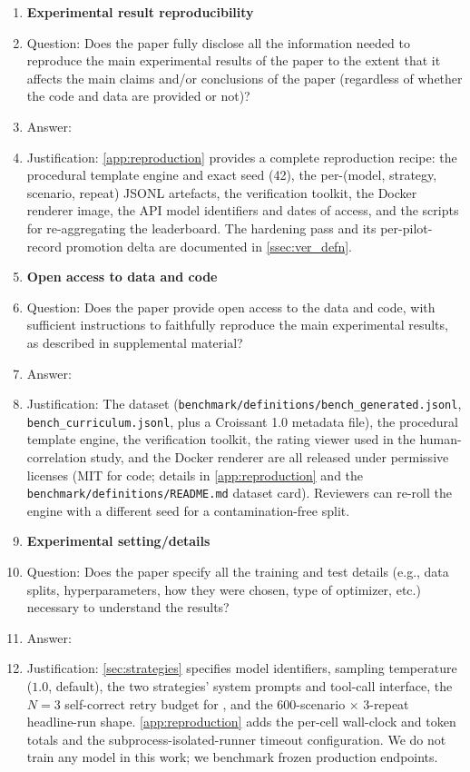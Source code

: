 \begin{enumerate}
\item {\bf Experimental result reproducibility}
\item[] Question: Does the paper fully disclose all the information needed to reproduce the main experimental results of the paper to the extent that it affects the main claims and/or conclusions of the paper (regardless of whether the code and data are provided or not)?
\item[] Answer: \answerYes{}
\item[] Justification: \cref{app:reproduction} provides a complete reproduction recipe: the procedural template engine and exact seed (42), the per-(model, strategy, scenario, repeat) JSONL artefacts, the verification toolkit, the Docker renderer image, the API model identifiers and dates of access, and the scripts for re-aggregating the leaderboard. The hardening pass and its per-pilot-record promotion delta are documented in \cref{ssec:ver_defn}.

\item {\bf Open access to data and code}
\item[] Question: Does the paper provide open access to the data and code, with sufficient instructions to faithfully reproduce the main experimental results, as described in supplemental material?
\item[] Answer: \answerYes{}
\item[] Justification: The dataset (\texttt{benchmark/definitions/bench\_generated.jsonl}, \texttt{bench\_curriculum.jsonl}, plus a Croissant 1.0 metadata file), the procedural template engine, the verification toolkit, the rating viewer used in the human-correlation study, and the Docker renderer are all released under permissive licenses (MIT for code; details in \cref{app:reproduction} and the \texttt{benchmark/definitions/README.md} dataset card). Reviewers can re-roll the engine with a different seed for a contamination-free split.

\item {\bf Experimental setting/details}
\item[] Question: Does the paper specify all the training and test details (e.g., data splits, hyperparameters, how they were chosen, type of optimizer, etc.) necessary to understand the results?
\item[] Answer: \answerYes{}
\item[] Justification: \cref{sec:strategies} specifies model identifiers, sampling temperature ($1.0$, default), the two strategies' system prompts and tool-call interface, the $N{=}3$ self-correct retry budget for \structured, and the 600-scenario $\times$ 3-repeat headline-run shape. \cref{app:reproduction} adds the per-cell wall-clock and token totals and the subprocess-isolated-runner timeout configuration. We do not train any model in this work; we benchmark frozen production endpoints.


\end{enumerate}
